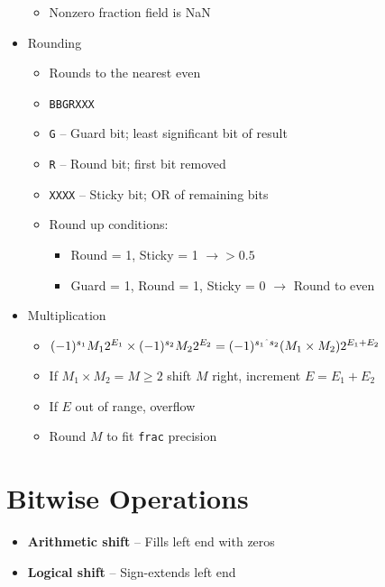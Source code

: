 \documentclass[twocolumn]{article}
\renewcommand{\tt}[1]{\texttt{#1}}
\begin{document}
\begin{itemize}[noitemsep]
\begin{itemize}[noitemsep]
        \item Nonzero fraction field is NaN
    \end{itemize}
    \item Rounding
    \begin{itemize}[noitemsep]
        \item Rounds to the nearest even
        \item \tt{BBGRXXX}
        \item \tt{G} -- Guard bit; least significant bit of result
        \item \tt{R} -- Round bit; first bit removed
        \item \tt{XXXX} -- Sticky bit; OR of remaining bits
        \item Round up conditions:
        \begin{itemize}[noitemsep]
            \item Round = 1, Sticky = 1 $\to > 0.5$
            \item Guard = 1, Round = 1, Sticky = 0 $\to$ Round to even
        \end{itemize}
    \end{itemize}
    \item Multiplication
    \begin{itemize}[noitemsep]
        \item $(-1)^{s_1}M_12^{E_1} \times (-1)^{s_2}M_22^{E_2} = (-1)^{s_1 \string^ s_2}(M_1 \times M_2)2^{E_1 + E_2}$
        \item If $M_1 \times M_2 = M \geq 2$ shift $M$ right, increment $E = E_1 + E_2$
        \item If $E$ out of range, overflow
        \item Round $M$ to fit \tt{frac} precision
    \end{itemize}
\end{itemize}

\section{Bitwise Operations}
\begin{itemize}[noitemsep]
    \item \textbf{Arithmetic shift} -- Fills left end with zeros
    \item \textbf{Logical shift} -- Sign-extends left end
\end{itemize}
\end{document}
